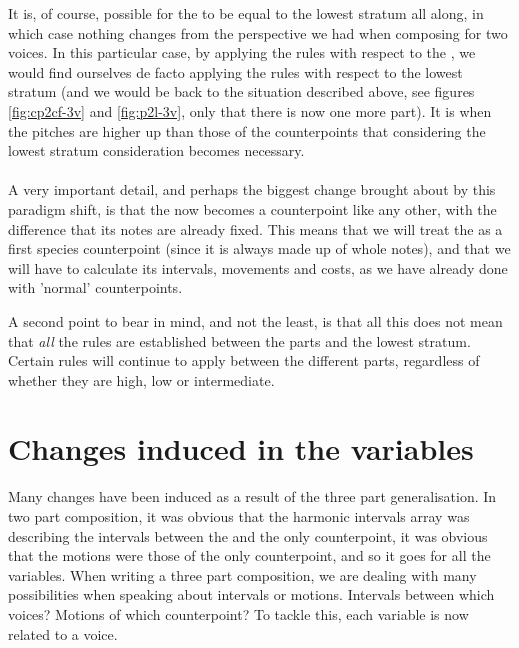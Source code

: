 It is, of course, possible for the \cfs to be equal to the lowest stratum all along, in which case nothing changes from the perspective we had when composing for two voices. In this particular case, by applying the rules with respect to the \cf, we would find ourselves de facto applying the rules with respect to the lowest stratum (and we would be back to the situation described above, see figures \ref{fig:cp2cf-3v} and \ref{fig:p2l-3v}, only that there is now one more part). It is when the \cfs pitches are higher up than those of the counterpoints that considering the lowest stratum consideration becomes necessary.

\paragraph{}
A very important detail, and perhaps the biggest change brought about by this paradigm shift, is that the \cfs now becomes a counterpoint like any other, with the difference that its notes are already fixed. This means that we will treat the \cfs as a first species counterpoint (since it is always made up of whole notes), and that we will have to calculate its intervals, movements and costs, as we have already done with 'normal' counterpoints.

A second point to bear in mind, and not the least, is that all this does not mean that \textit{all} the rules are established between the parts and the lowest stratum. Certain rules will continue to apply between the different parts, regardless of whether they are high, low or intermediate.

\section{Changes induced in the variables} \label{section:changes induced}

Many changes have been induced as a result of the three part generalisation. In two part composition, it was obvious that the harmonic intervals array was describing the intervals between the \cfs and the only counterpoint, it was obvious that the motions were those of the only counterpoint, and so it goes for all the variables. When writing a three part composition, we are dealing with many possibilities when speaking about intervals or motions. Intervals between which voices? Motions of which counterpoint? To tackle this, each variable is now related to a voice.

